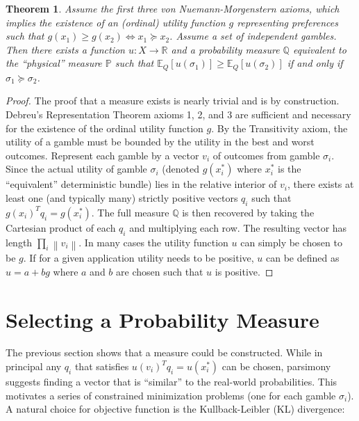 \documentclass{article}
\newtheorem{theorem}{Theorem}
\newcommand{\norm}[1]{\left\lVert#1\right\rVert}
\begin{document}
\begin{theorem} \label{theorem1}
Assume the first three von Nuemann-Morgenstern axioms, which implies the existence of an (ordinal) utility function \(g\) representing preferences such that \(g(x_1)\geq g(x_2) \Leftrightarrow x_1 \succeq x_2 \).  Assume a set of independent gambles.  Then there exists a function \(u: X \to \mathbb{R}\) and a probability measure \(\mathbb{Q}\) equivalent to the ``physical'' measure \(\mathbb{P}\) such that \(\mathbb{E}_Q\left[u(\sigma_1)\right] \geq \mathbb{E}_Q\left[u(\sigma_2)\right]\) if and only if \(\sigma_1 \succeq \sigma_2\).
\end{theorem}

\begin{proof}
The proof that a measure exists is nearly trivial and is by construction.  Debreu's Representation Theorem axioms 1, 2, and 3 are sufficient and necessary for the existence of the ordinal utility function \(g\).  By the Transitivity axiom, the utility of a gamble must be bounded by the utility in the best and worst outcomes.
Represent each gamble by a vector \(v_i\) of outcomes from gamble \(\sigma_i\).  Since the actual utility of gamble \(\sigma_i\) (denoted \(g(x^*_i)\) where \(x^*_i\) is the ``equivalent'' deterministic bundle) lies in the relative interior of \(v_i\), there exists at least one (and typically many) strictly positive vectors \(q_i\) such that \(g(x_i)^T q_i = g(x^*_i)\).
The full measure \(\mathbb{Q}\) is then recovered by taking the Cartesian product of each \(q_i\) and multiplying each row.  The resulting vector has length \(\prod_i \norm{v_i} \).  In many cases the utility function \(u\) can simply be chosen to be \(g\).  If for a given application utility needs to be positive, \(u\) can be defined as \(u = a+bg\) where \(a\) and \(b\) are chosen such that \(u\) is positive.

\end{proof}

\section{Selecting a Probability Measure}

The previous section shows that a measure could be constructed.  While in principal any \(q_i\) that satisfies \(u(v_i)^T q_i = u(x^*_i)\) can be chosen, parsimony suggests finding a vector that is ``similar'' to the real-world probabilities.
This motivates a series of constrained minimization problems (one for each gamble \(\sigma_i\)).  A natural choice for objective function is the Kullback-Leibler (KL) divergence:
\end{document}
